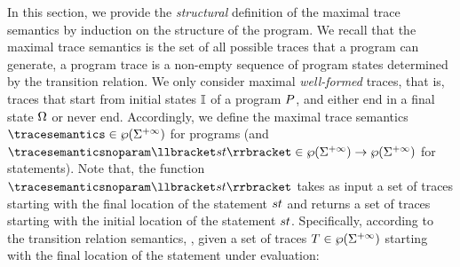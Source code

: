 
In this section, we provide the \emph{structural} definition of the maximal trace semantics by induction on the structure of the program. We recall that the maximal trace semantics is the set of all possible traces that a program can generate, a program trace is a non-empty sequence of program states determined by the transition relation. We only consider maximal \emph{well-formed} traces, that is, traces that start from initial states $\mathbb{I}$ of a program $P$, and either end in a final state $\Omega$ or never end.
Accordingly, we define the maximal trace semantics $\tracesemantics\in\tracetype$ for programs (and $\tracesemanticsnoparam\semanticsof{\defstmt}\in\tracetype \to \tracetype$ for statements). Note that, the function $\tracesemanticsnoparam\semanticsof{\defstmt}$ takes as input a set of traces starting with the final location of the statement $st$ and returns a set of traces starting with the initial location of the statement $st$. Specifically, according to the transition relation semantics, \cf{} , given a set of traces $T\in\wp(\Sigma^{+\infty})$ starting with the final location of the statement under evaluation:


